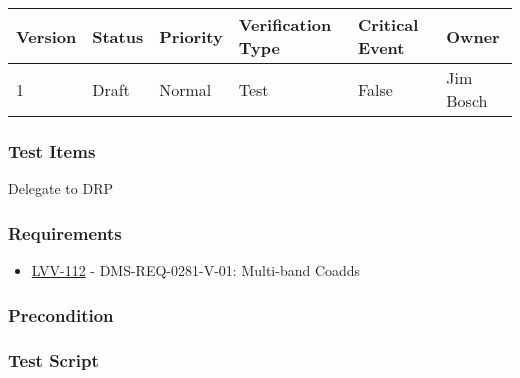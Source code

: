 \begin{longtable}[]{@{}llllll@{}}
\toprule
Version & Status & Priority & Verification Type & Critical Event &
Owner\tabularnewline
\midrule
\endhead
1 & Draft & Normal & Test & False & Jim Bosch\tabularnewline
\bottomrule
\end{longtable}

\hypertarget{test-items-51}{%
\subsubsection{Test Items}\label{test-items-51}}

Delegate to DRP

\hypertarget{requirements-52}{%
\subsubsection{Requirements}\label{requirements-52}}

\begin{itemize}
\tightlist
\item
  \href{https://jira.lsstcorp.org/browse/LVV-112}{LVV-112} -
  DMS-REQ-0281-V-01: Multi-band Coadds
\end{itemize}

\hypertarget{precondition-7}{%
\subsubsection{Precondition}\label{precondition-7}}

\hypertarget{test-script-52}{%
\subsubsection{Test Script}\label{test-script-52}}

